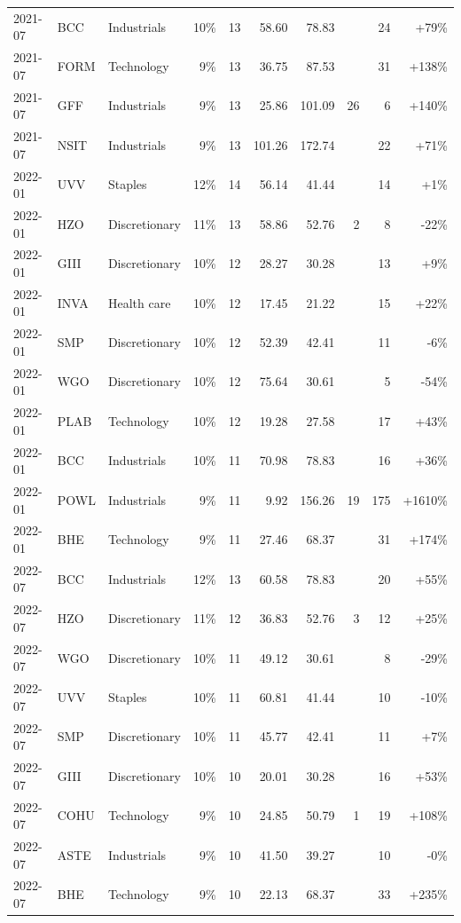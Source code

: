 \documentclass[11pt,a4paper]{article}
\begin{document}
{\begin{longtable}{l l l r r r r r r r}
2021-07 & BCC & Industrials & 10\% & 13 & 58.60 & 78.83 &  & 24 & +79\% \\
2021-07 & FORM & Technology & 9\% & 13 & 36.75 & 87.53 &  & 31 & +138\% \\
2021-07 & GFF & Industrials & 9\% & 13 & 25.86 & 101.09 & 26 & 6 & +140\% \\
2021-07 & NSIT & Industrials & 9\% & 13 & 101.26 & 172.74 &  & 22 & +71\% \\
2022-01 & UVV & Staples & 12\% & 14 & 56.14 & 41.44 &  & 14 & +1\% \\
2022-01 & HZO & Discretionary & 11\% & 13 & 58.86 & 52.76 & 2 & 8 & -22\% \\
2022-01 & GIII & Discretionary & 10\% & 12 & 28.27 & 30.28 &  & 13 & +9\% \\
2022-01 & INVA & Health care & 10\% & 12 & 17.45 & 21.22 &  & 15 & +22\% \\
2022-01 & SMP & Discretionary & 10\% & 12 & 52.39 & 42.41 &  & 11 & -6\% \\
2022-01 & WGO & Discretionary & 10\% & 12 & 75.64 & 30.61 &  & 5 & -54\% \\
2022-01 & PLAB & Technology & 10\% & 12 & 19.28 & 27.58 &  & 17 & +43\% \\
2022-01 & BCC & Industrials & 10\% & 11 & 70.98 & 78.83 &  & 16 & +36\% \\
2022-01 & POWL & Industrials & 9\% & 11 & 9.92 & 156.26 & 19 & 175 & +1610\% \\
2022-01 & BHE & Technology & 9\% & 11 & 27.46 & 68.37 &  & 31 & +174\% \\
2022-07 & BCC & Industrials & 12\% & 13 & 60.58 & 78.83 &  & 20 & +55\% \\
2022-07 & HZO & Discretionary & 11\% & 12 & 36.83 & 52.76 & 3 & 12 & +25\% \\
2022-07 & WGO & Discretionary & 10\% & 11 & 49.12 & 30.61 &  & 8 & -29\% \\
2022-07 & UVV & Staples & 10\% & 11 & 60.81 & 41.44 &  & 10 & -10\% \\
2022-07 & SMP & Discretionary & 10\% & 11 & 45.77 & 42.41 &  & 11 & +7\% \\
2022-07 & GIII & Discretionary & 10\% & 10 & 20.01 & 30.28 &  & 16 & +53\% \\
2022-07 & COHU & Technology & 9\% & 10 & 24.85 & 50.79 & 1 & 19 & +108\% \\
2022-07 & ASTE & Industrials & 9\% & 10 & 41.50 & 39.27 &  & 10 & -0\% \\
2022-07 & BHE & Technology & 9\% & 10 & 22.13 & 68.37 &  & 33 & +235\% \\

\end{longtable}}
\end{document}
